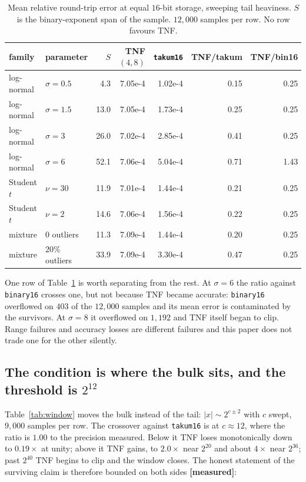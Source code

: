 \documentclass[11pt]{article}
\theoremstyle{definition}
\begin{document}
\begin{table}[htbp]\centering\small
\caption{Mean relative round-trip error at equal $16$-bit storage, sweeping tail
heaviness. $S$ is the binary-exponent span of the sample. $12{,}000$ samples per
row. No row favours TNF.}
\label{tab:tailsweep}
\begin{tabular}{llrrrrr}
\hline
family & parameter & $S$ & TNF$(4,8)$ & \texttt{takum16} & TNF/takum & TNF/bin16 \\
\hline
log-normal & $\sigma=0.5$ & 4.3 & 7.05e-4 & 1.02e-4 & 0.15 & 0.25 \\
log-normal & $\sigma=1.5$ & 13.0 & 7.05e-4 & 1.73e-4 & 0.25 & 0.25 \\
log-normal & $\sigma=3$ & 26.0 & 7.02e-4 & 2.85e-4 & 0.41 & 0.25 \\
log-normal & $\sigma=6$ & 52.1 & 7.06e-4 & 5.04e-4 & 0.71 & 1.43 \\
Student $t$ & $\nu=30$ & 11.9 & 7.01e-4 & 1.44e-4 & 0.21 & 0.25 \\
Student $t$ & $\nu=2$ & 14.6 & 7.06e-4 & 1.56e-4 & 0.22 & 0.25 \\
mixture & $0$ outliers & 11.3 & 7.09e-4 & 1.44e-4 & 0.20 & 0.25 \\
mixture & $20\%$ outliers & 33.9 & 7.09e-4 & 3.30e-4 & 0.47 & 0.25 \\
\hline
\end{tabular}
\end{table}

One row of Table~\ref{tab:tailsweep} is worth separating from the rest. At
$\sigma=6$ the ratio against \texttt{binary16} crosses one, but not because TNF
became accurate: \texttt{binary16} overflowed on $403$ of the $12{,}000$ samples and
its mean error is contaminated by the survivors. At $\sigma=8$ it overflowed on
$1{,}192$ and TNF itself began to clip. Range failures and accuracy losses are
different failures and this paper does not trade one for the other silently.

\subsection{The condition is where the bulk sits, and the threshold is $2^{12}$}

Table~\ref{tab:window} moves the bulk instead of the tail: $|x|\sim 2^{c\pm 2}$
with $c$ swept, $9{,}000$ samples per row. The crossover against \texttt{takum16}
is at $c\approx 12$, where the ratio is $1.00$ to the precision measured. Below it
TNF loses monotonically down to $0.19\times$ at unity; above it TNF gains, to
$2.0\times$ near $2^{20}$ and about $4\times$ near $2^{36}$; past $2^{40}$ TNF
begins to clip and the window closes. The honest statement of the surviving claim
is therefore bounded on both sides \textbf{[measured]}:
\end{document}
